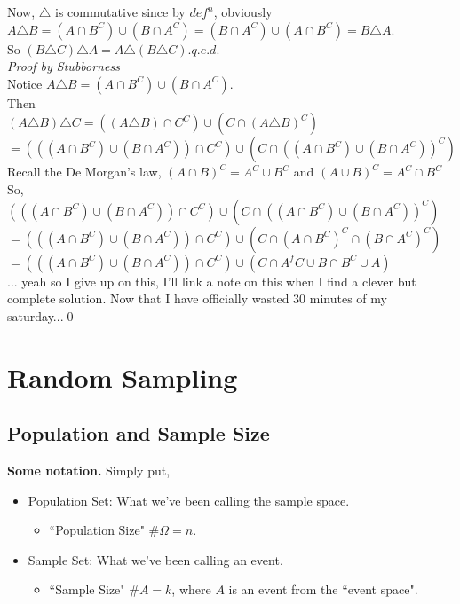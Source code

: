 \documentclass[12pt]{book}
\begin{document}
Now, $\triangle$ is commutative since by $def^n$, obviously \\
$A\triangle B=(A\cap B^{C}) \cup (B \cap A^{C})= (B \cap A^{C}) \cup (A\cap B^{C}) = B\triangle A$.\\
\noindent So $(B \triangle C) \triangle A = A \triangle (B \triangle C)$.\hfill$q.e.d.$\\

\noindent \textit{Proof by Stubborness}\\
\noindent Notice $A\triangle B=(A\cap B^{C}) \cup (B \cap A^{C})$.\\

\noindent Then \\
$(A \triangle B) \triangle C = ((A \triangle B)\cap C^{C}) \cup (C \cap (A \triangle B)^{C})$\\
$=(((A\cap B^{C}) \cup (B \cap A^{C}))\cap C^{C}) \cup (C \cap ((A\cap B^{C}) \cup (B \cap A^{C}))^{C})$\\

\noindent Recall the De Morgan's law, $(A \cap B)^{C}= A^{C} \cup B^{C}$ and $(A \cup B)^{C}= A^{C} \cap B^{C}$\\

\noindent So, \\
$(((A\cap B^{C}) \cup (B \cap A^{C}))\cap C^{C}) \cup (C \cap ((A\cap B^{C}) \cup (B \cap A^{C}))^{C})$\\
$=(((A\cap B^{C}) \cup (B \cap A^{C}))\cap C^{C}) \cup (C \cap (A\cap B^{C})^{C} \cap (B \cap A^{C})^{C})$\\
$=(((A\cap B^{C}) \cup (B \cap A^{C}))\cap C^{C}) \cup (C \cap A^f{C} \cup B \cap B^{C} \cup A)$\\

\noindent ... yeah so I give up on this, I'll link a note on this when I find a clever but complete solution. Now that I have officially wasted 30 minutes of my saturday...\qed





\section{Random Sampling }
\subsection{Population and Sample Size}

\textbf{Some notation.}
Simply put, 
\begin{itemize}
\item Population Set: What we've been calling the sample space.
	\begin{itemize}\item``Population Size" $\# \Omega = n$.\end{itemize}
\item Sample Set: What we've been calling an event.
	\begin{itemize}\item``Sample Size" $\# A = k$, where $A$ is an event from the ``event space".\end{itemize}
\end{itemize}
\end{document}
